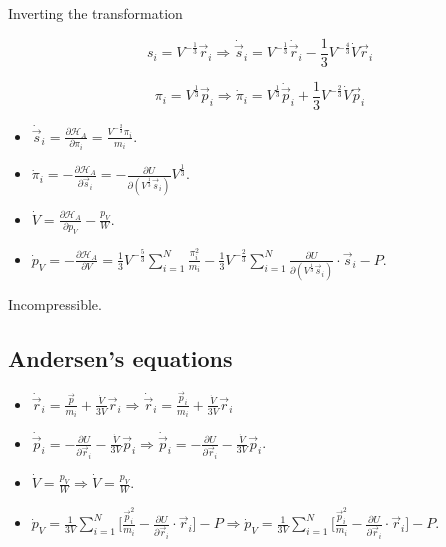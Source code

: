 Inverting the transformation

$$s_i = V^{-\frac{1}{3}}\vec{r}_i\Rightarrow \dot{\vec{s}}_i = V^{-\frac{1}{3}}\dot{\vec{r}}_i-\frac{1}{3}V^{-\frac{4}{3}}\dot{V}\vec{r}_i$$

$$\pi_i = V^{\frac{1}{3}}\vec{p}_i \Rightarrow \dot{\pi}_i = V^{\frac{1}{3}}\dot{\vec{p}}_i + \frac{1}{3}V^{-\frac{2}{3}}\dot{V}\vec{p}_i$$

\begin{itemize}
	\item $\dot{\vec{s}}_i = \frac{\partial \mathcal{H}_A}{\partial\pi_i} = \frac{V^{-\frac{2}{3}}\pi_i}{m_i}$.
	\item $\dot{\pi}_i = -\frac{\partial\mathcal{H}_A}{\partial\vec{s}_i} = -\frac{\partial U}{\partial (V^{\frac{1}{3}}\vec{s}_i)}V^{\frac{1}{3}}$.
	\item $\dot{V} = \frac{\partial\mathcal{H}_A}{\partial p_V}-\frac{p_V}{W}$.
	\item $\dot{p}_V = -\frac{\partial\mathcal{H}_A}{\partial V} = \frac{1}{3}V^{-\frac{5}{3}}\sum\limits_{i=1}^N\frac{\pi_i^2}{m_i}-\frac{1}{3}V^{-\frac{2}{3}}\sum\limits_{i=1}^N\frac{\partial U}{\partial(V^{\frac{1}{3}}\vec{s}_i)}\cdot\vec{s}_i-P$.
\end{itemize}

Incompressible.

	\subsection{Andersen's equations}

	\begin{multicols}{2}
		\begin{itemize}
			\item $\dot{\vec{r}}_i = \frac{\vec{p}}{m_i} + \frac{\dot{V}}{3V}\vec{r}_i\Rightarrow\dot{\vec{r}}_i = \frac{\vec{p}_i}{m_i} + \frac{\dot{V}}{3V}\vec{r}_i$
			\item $\dot{\vec{p}}_i = -\frac{\partial U}{\partial\vec{r}_i} -\frac{\dot{V}}{3V}\vec{p}_i\Rightarrow \dot{\vec{p}}_i = -\frac{\partial U}{\partial\vec{r}_i}-\frac{\dot{V}}{3V}\vec{p}_i$.
			\item $\dot{V} = \frac{p_V}{W}\Rightarrow\dot{V} = \frac{p_V}{W}$.
			\item $\dot{p}_V = \frac{1}{3V}\sum\limits_{i=1}^N\biggl[\frac{\vec{p}_i^2}{m_i}-\frac{\partial U}{\partial\vec{r}_i}\cdot\vec{r}_i\biggr]-P\Rightarrow\dot{p}_V = \frac{1}{3V}\sum\limits_{i=1}^N\biggl[\frac{\vec{p}_i^2}{m_i}-\frac{\partial U}{\partial\vec{r}_i}\cdot\vec{r}_i\biggr]-P$.
		\end{itemize}
	\end{multicols}

